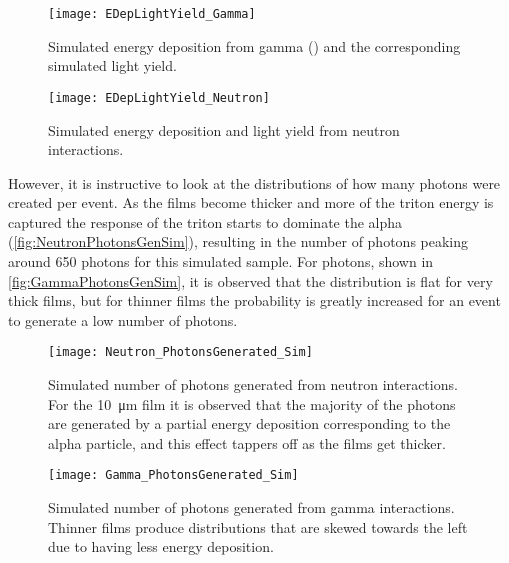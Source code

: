 \begin{figure}
 	\centering
  	\texttt{[image: EDepLightYield\_Gamma]}
		\caption[Energy Deposition and Light Yield in Polystyrene from Co-60 Photons]{Simulated energy deposition from gamma () and the corresponding simulated light yield. \SimEDeLYGeo}
\end{figure}
\begin{figure}
 	\centering
  	\texttt{[image: EDepLightYield\_Neutron]}
  	\caption[Energy Deposition and Light Yield in Polystyrene from Neutrons]{Simulated energy deposition and light yield from neutron interactions.  \SimEDeLYGeo}
  \label{fig:EDepLightYield}
\end{figure}
However, it is instructive to look at the distributions of how many photons were created per event.
As the films become thicker and more of the triton energy is captured the response of the triton starts to dominate the alpha (\autoref{fig:NeutronPhotonsGenSim}), resulting in the number of photons peaking around 650 photons for this simulated sample.
For photons, shown in \autoref{fig:GammaPhotonsGenSim}, it is observed that the distribution is flat for very thick films, but for thinner films the probability is greatly increased for an event to generate a low number of photons.
\begin{figure}
  \centering
  \texttt{[image: Neutron\_PhotonsGenerated\_Sim]}
  \caption[Number of photons generated from neutron interactions]{Simulated number of photons generated from neutron interactions.  For the \SI{10}{\um} film it is observed that the majority of the photons are generated by a partial energy deposition corresponding to the alpha particle, and this effect tappers off as the films get thicker. \SimEDeLYGeo}
  \label{fig:NeutronPhotonsGenSim}
\end{figure}
\begin{figure}
  \centering
  \texttt{[image: Gamma\_PhotonsGenerated\_Sim]}
  \caption[Number of photons generated from gamma interactions]{Simulated number of photons generated from gamma interactions. Thinner films produce distributions that are skewed towards the left due to having less energy deposition. \SimEDeLYGeo}
  \label{fig:GammaPhotonsGenSim}
\end{figure}

